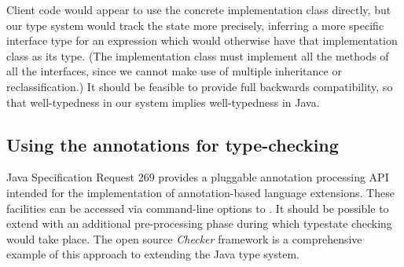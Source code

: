 \noindent Client code would appear to use the concrete implementation
class directly, but our type system would track the state more
precisely, inferring a more specific interface type for an expression
which would otherwise have that implementation class as its type. (The
implementation class must implement all the methods of all the
interfaces, since we cannot make use of multiple inheritance or
reclassification.) It should be feasible to provide full backwards
compatibility, so that well-typedness in our system implies
well-typedness in Java.

\subsection{Using the annotations for type-checking}

Java Specification Request 269 \cite{jsr269} provides a pluggable
annotation processing API intended for the implementation of
annotation-based language extensions. These facilities can be accessed
via command-line options to . It should be possible to
extend  with an additional pre-processing phase during
which typestate checking would take place. The open source
\emph{Checker} framework \cite{papi08,dietl11} is a comprehensive
example of this approach to extending the Java type system.
